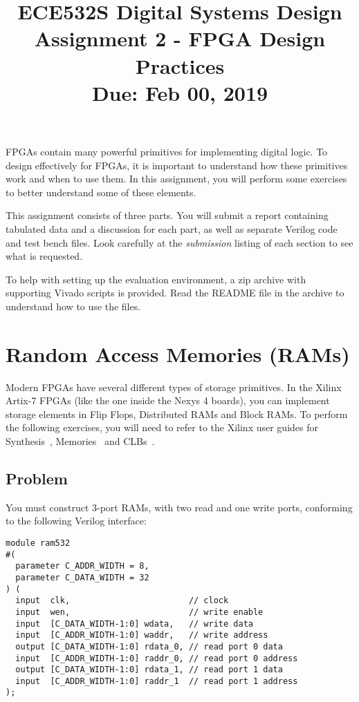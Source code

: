 \documentclass{article}
\title{ECE532S Digital Systems Design \\ \vspace{0.4cm}
       \Large Assignment 2 - FPGA Design Practices \\ \vspace{0.4cm}
       \small Due: Feb 00, 2019}
\author{ }
\date{ }
\begin{document}
\maketitle
\vspace{-1cm}

FPGAs contain many powerful primitives for implementing digital logic.
To design effectively for FPGAs, it is important to understand how these primitives work and when to use them.
In this assignment, you will perform some exercises to better understand some of these elements.

This assignment consists of three parts.
You will submit a report containing tabulated data and a discussion for each part, as well as separate Verilog code and test bench files. Look carefully at the \emph{submission} listing of each section to see what is requested.

To help with setting up the evaluation environment, a zip archive with supporting Vivado scripts is provided.
Read the README file in the archive to understand how to use the files.

\section{Random Access Memories (RAMs)}
Modern FPGAs have several different types of storage primitives.
In the Xilinx Artix-7 FPGAs (like the one inside the Nexys 4 boards), you can implement storage elements in Flip Flops, Distributed RAMs and Block RAMs.
To perform the following exercises, you will need to refer to the Xilinx user guides for Synthesis~\cite{xilinxsynth}, Memories~\cite{xilinxmem} and CLBs~\cite{xilinxclb}.

\subsection{Problem}

You must construct 3-port RAMs, with two read and one write ports, conforming to the following Verilog interface:

\begin{verbatim}
module ram532
#(
  parameter C_ADDR_WIDTH = 8,
  parameter C_DATA_WIDTH = 32
) (
  input  clk,                        // clock
  input  wen,                        // write enable
  input  [C_DATA_WIDTH-1:0] wdata,   // write data
  input  [C_ADDR_WIDTH-1:0] waddr,   // write address
  output [C_DATA_WIDTH-1:0] rdata_0, // read port 0 data
  input  [C_ADDR_WIDTH-1:0] raddr_0, // read port 0 address
  output [C_DATA_WIDTH-1:0] rdata_1, // read port 1 data
  input  [C_ADDR_WIDTH-1:0] raddr_1  // read port 1 address
);
\end{verbatim}
\end{document}

